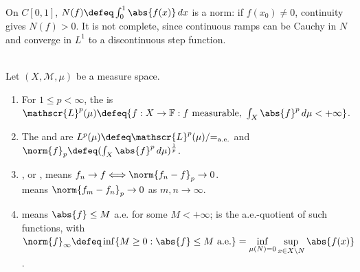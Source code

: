 \begin{remark} \label{rem:continuous-functions-integral-metric-crossref} \\
On $C[0,1]$, $N(f)\defeq\int_0^1\abs{f(x)}\,dx$ is a norm: if $f(x_0)\neq0$, continuity gives $N(f)>0$. It is not complete, since continuous ramps can be Cauchy in $N$ and converge in $L^1$ to a discontinuous step function.
\end{remark}

\begin{definition} \label{def:lp-and-linfty-lebesgue-spaces} \\
Let $(X,\mathcal{M},\mu)$ be a measure space.
\begin{enumerate}[label=(\roman*)]
\setlength{\itemsep}{0pt}
\item For $1\leq p<\infty$, the  is $\mathscr{L}^p(\mu)\defeq\{f:X\to\mathbb{F}:f\text{ measurable},\ \int_X\abs{f}^p\,d\mu<+\infty\}$.
\item The  and  are $L^p(\mu)\defeq\mathscr{L}^p(\mu)/{=_{\mathrm{a.e.}}}$ and $\norm{f}_p\defeq(\int_X\abs{f}^p\,d\mu)^{\frac{1}{p}}$.
\item {}, or , means $f_n\to f\Longleftrightarrow\norm{f_n-f}_p\to0$.\\
 means $\norm{f_m-f_n}_p\to0$ as $m,n\to\infty$.
\item {} means $\abs{f}\leq M$ a.e. for some $M<+\infty$;  is the a.e.-quotient of such functions, with  $\norm{f}_\infty\defeq\inf\{M\geq0:\abs{f}\leq M\text{ a.e.}\}=\inf\limits_{\mu(N)=0}\sup\limits_{x\in X\setminus N}\abs{f(x)}$.
\end{enumerate}
\end{definition}


